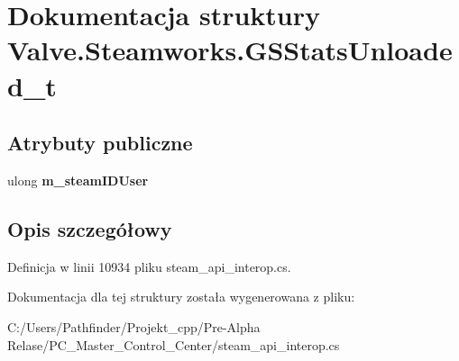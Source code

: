 \hypertarget{struct_valve_1_1_steamworks_1_1_g_s_stats_unloaded__t}{}\section{Dokumentacja struktury Valve.\+Steamworks.\+G\+S\+Stats\+Unloaded\+\_\+t}
\label{struct_valve_1_1_steamworks_1_1_g_s_stats_unloaded__t}
\subsection*{Atrybuty publiczne}
\begin{DoxyCompactItemize}
\item 
\mbox{\label{struct_valve_1_1_steamworks_1_1_g_s_stats_unloaded__t_acb88619ca8d66c126f76539f5a1bfeea}} 
ulong {\bfseries m\+\_\+steam\+I\+D\+User}
\end{DoxyCompactItemize}


\subsection{Opis szczegółowy}


Definicja w linii 10934 pliku steam\+\_\+api\+\_\+interop.\+cs.



Dokumentacja dla tej struktury została wygenerowana z pliku\+:\begin{DoxyCompactItemize}
\item 
C\+:/\+Users/\+Pathfinder/\+Projekt\+\_\+cpp/\+Pre-\/\+Alpha Relase/\+P\+C\+\_\+\+Master\+\_\+\+Control\+\_\+\+Center/steam\+\_\+api\+\_\+interop.\+cs\end{DoxyCompactItemize}
